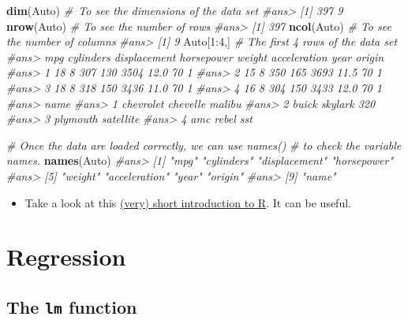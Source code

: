\documentclass[]{book}
\newenvironment{Shaded}{\begin{snugshade}}{\end{snugshade}}
\newcommand{\KeywordTok}[1]{\textcolor[rgb]{0.13,0.29,0.53}{\textbf{{#1}}}}
\newcommand{\DecValTok}[1]{\textcolor[rgb]{0.00,0.00,0.81}{{#1}}}
\newcommand{\CommentTok}[1]{\textcolor[rgb]{0.56,0.35,0.01}{\textit{{#1}}}}
\newcommand{\NormalTok}[1]{{#1}}
\newenvironment{rmdblock}[1]
  {\begin{shaded*}
  \begin{itemize}
  \renewcommand{\labelitemi}{
    \raisebox{-.7\height}[0pt][0pt]{
      {\setkeys{Gin}{width=2em,keepaspectratio}\texttt{[image: img/icons/\#1]}}
    }
  }
  \item
  }
  {
  \end{itemize}
  \end{shaded*}
  }
\newenvironment{rmdinsight}
  {\begin{rmdblock}{insight}}
  {\end{rmdblock}}
\begin{document}
\begin{Shaded}
\begin{Highlighting}[]
\KeywordTok{dim}\NormalTok{(Auto) }\CommentTok{# To see the dimensions of the data set}
\CommentTok{#ans> [1] 397   9}
\KeywordTok{nrow}\NormalTok{(Auto) }\CommentTok{# To see the number of rows}
\CommentTok{#ans> [1] 397}
\KeywordTok{ncol}\NormalTok{(Auto) }\CommentTok{# To see the number of columns}
\CommentTok{#ans> [1] 9}
\NormalTok{Auto[}\DecValTok{1}\NormalTok{:}\DecValTok{4}\NormalTok{,] }\CommentTok{# The first 4 rows of the data set}
\CommentTok{#ans>   mpg cylinders displacement horsepower weight acceleration year origin}
\CommentTok{#ans> 1  18         8          307        130   3504         12.0   70      1}
\CommentTok{#ans> 2  15         8          350        165   3693         11.5   70      1}
\CommentTok{#ans> 3  18         8          318        150   3436         11.0   70      1}
\CommentTok{#ans> 4  16         8          304        150   3433         12.0   70      1}
\CommentTok{#ans>                        name}
\CommentTok{#ans> 1 chevrolet chevelle malibu}
\CommentTok{#ans> 2         buick skylark 320}
\CommentTok{#ans> 3        plymouth satellite}
\CommentTok{#ans> 4             amc rebel sst}
\end{Highlighting}
\end{Shaded}

\begin{Shaded}
\begin{Highlighting}[]
\CommentTok{# Once the data are loaded correctly, we can use names()}
\CommentTok{# to check the variable names.}
\KeywordTok{names}\NormalTok{(Auto)}
\CommentTok{#ans> [1] "mpg"          "cylinders"    "displacement" "horsepower"  }
\CommentTok{#ans> [5] "weight"       "acceleration" "year"         "origin"      }
\CommentTok{#ans> [9] "name"}
\end{Highlighting}
\end{Shaded}

\begin{rmdinsight}
Take a look at this
\href{https://cran.r-project.org/doc/contrib/Torfs+Brauer-Short-R-Intro.pdf}{(very)
short introduction to R}. It can be useful.
\end{rmdinsight}

\section{Regression}\label{regression}

\subsection{\texorpdfstring{The \texttt{lm}
function}{The lm function}}\label{the-lm-function}
\end{document}
